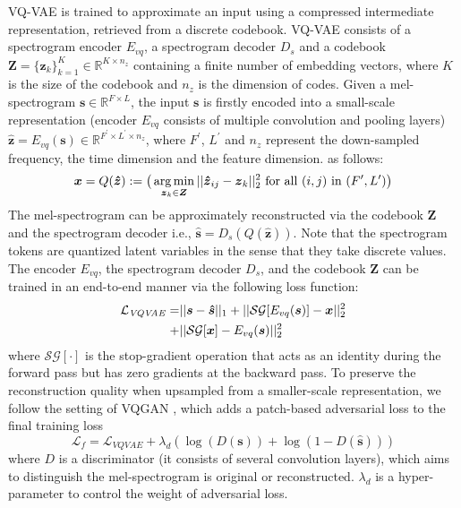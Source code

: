 \documentclass[lettersize,journal]{IEEEtran}
\begin{document}
VQ-VAE is trained to approximate an input using a compressed intermediate representation, retrieved from a discrete codebook. VQ-VAE consists of a spectrogram encoder $E_{vq}$, a spectrogram decoder $D_s$ and a codebook $\boldsymbol{Z}=\{ \boldsymbol{z}_k\}^K_{k=1} \in \mathbb{R}^{K \times n_z}$ containing a finite number of embedding vectors, where $K$ is the size of the codebook and $n_z$ is the dimension of codes. Given a mel-spectrogram $\boldsymbol{s} \in \mathbb{R}^{F \times L}$, the input $\boldsymbol{s}$ is firstly encoded into a small-scale representation (encoder $E_{vq}$ consists of multiple convolution and pooling layers) $\boldsymbol{\hat{z}}=E_{vq}(\boldsymbol{s}) \in \mathbb{R}^{F^{\prime} \times L^{\prime} \times n_z}$, where $F^{\prime}$, $L^{\prime}$ and $n_z$ represent the {\color{black}down-sampled frequency, the time dimension and the feature dimension.} 
{ as follows:}
\begin{equation}\label{codebook}
    \boldsymbol{x} = Q(\boldsymbol{\hat{z}}) := \big{(}\mathop{\arg\min}\limits_{\boldsymbol{z}_k \in \boldsymbol{Z}}||\boldsymbol{\hat{z}}_{ij}-\boldsymbol{ z}_k||_2^2 \ \mbox{for all} \ (i,j) \ \mbox{in} \ (F^{\prime}, L^{\prime})\big{)}
\end{equation}
The mel-spectrogram can be {\color{black}approximately} reconstructed via the codebook $\boldsymbol{Z}$ and the spectrogram decoder i.e., $\hat{\boldsymbol{s}}=D_s(Q(\boldsymbol{\hat{z}}))$. Note that the spectrogram tokens are quantized latent variables in the sense that they take discrete values. The encoder $E_{vq}$, the spectrogram decoder $D_s$, and the codebook $\boldsymbol{Z}$ can be trained {\color{black} in an end-to-end manner} via the following loss function:
\begin{align}\label{vqvae loss}
    \mathcal{L}_{\mathit{VQVAE}} =& ||\boldsymbol{s}-\boldsymbol{\hat{s}}||_1 +||\mathcal{SG}[E_{vq}(\boldsymbol{s})]-\boldsymbol{x}||_2^2 \\ +& ||\mathcal{SG}[\boldsymbol{x}]-E_{vq}(\boldsymbol{s})||_2^2 \noindent
\end{align}
where $\mathcal{SG}[\cdot]$ is the stop-gradient operation that acts as an identity during the forward pass but has zero gradients at the backward pass. To preserve the reconstruction quality when upsampled from a smaller-scale representation, we follow the setting of VQGAN \cite{esser2021taming}, which adds a patch-based adversarial loss \cite{isola2017image} to the final training loss
\begin{equation}\label{SpecVQVAE loss}
    \mathcal{L}_{\mathit{f}} =  \mathcal{L}_{\mathit{VQVAE}} + \lambda_d(\log(D(\boldsymbol{s})) + \log(1-D(\boldsymbol{\hat{s}})))
\end{equation}
where $D$ is a discriminator (it consists of several convolution layers), which aims to distinguish the mel-spectrogram is original or reconstructed. $\lambda_d$ is a hyper-parameter to control the weight of adversarial loss.
\end{document}
